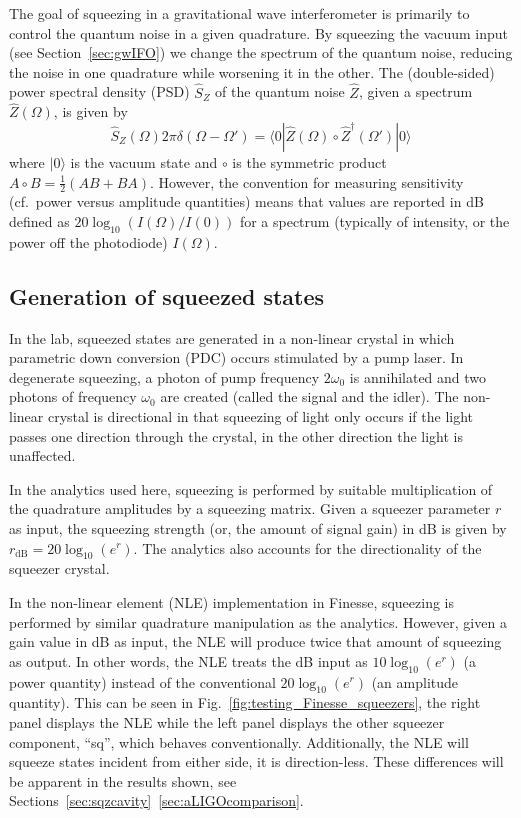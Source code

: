 \documentclass[aps,pra,superscriptaddress,reprint,nofootinbib]{revtex4-1}
\begin{document}
The goal of squeezing in a gravitational wave interferometer is primarily to control the quantum noise in a given quadrature. By squeezing the vacuum input (see Section~\ref{sec:gwIFO}) we change the spectrum of the quantum noise, reducing the noise in one quadrature while worsening it in the other. The (double-sided) power spectral density (PSD) $\hat{S}_Z$ of the quantum noise $\hat{Z}$, given a spectrum $\hat{Z}(\Omega)$, is given by $$\hat{S}_Z(\Omega) 2 \pi \delta(\Omega - \Omega') = \langle0| \hat{Z}(\Omega) \circ \hat{Z}^\dagger(\Omega') |0\rangle$$ where $|0\rangle$ is the vacuum state and $\circ$ is the symmetric product $A \circ B = \frac{1}{2}(A B + B A)$. However, the convention for measuring sensitivity (cf.\ power versus amplitude quantities) means that values are reported in dB defined as $20 \log_{10}(I(\Omega)/I(0))$ for a spectrum (typically of intensity, or the power off the photodiode) $I(\Omega)$.


\subsection{Generation of squeezed states}

In the lab, squeezed states are generated in a non-linear crystal in which parametric down conversion (PDC) occurs stimulated by a pump laser. In degenerate squeezing, a photon of pump frequency $2\omega_0$ is annihilated and two photons of frequency $\omega_0$ are created (called the signal and the idler). The non-linear crystal is directional in that squeezing of light only occurs if the light passes one direction through the crystal, in the other direction the light is unaffected.


In the analytics used here, squeezing is performed by suitable multiplication of the quadrature amplitudes by a squeezing matrix. Given a squeezer parameter $r$ as input, the squeezing strength (or, the amount of signal gain) in dB is given by $r_{\mathrm{dB}} = 20 \log_{10}(e^r)$. The analytics also accounts for the directionality of the squeezer crystal.


In the non-linear element (NLE) implementation in Finesse, squeezing is performed by similar quadrature manipulation as the analytics. However, given a gain value in dB as input, the NLE will produce twice that amount of squeezing as output. In other words, the NLE treats the dB input as $10 \log_{10} (e^r)$ (a power quantity) instead of the conventional $20 \log_{10} (e^r)$ (an amplitude quantity). This can be seen in Fig.~\ref{fig:testing_Finesse_squeezers}, the right panel displays the NLE while the left panel displays the other squeezer component, “sq”, which behaves conventionally. Additionally, the NLE will squeeze states incident from either side, it is direction-less. These differences will be apparent in the results shown, see Sections~\ref{sec:sqzcavity}~\ref{sec:aLIGOcomparison}.
\end{document}
